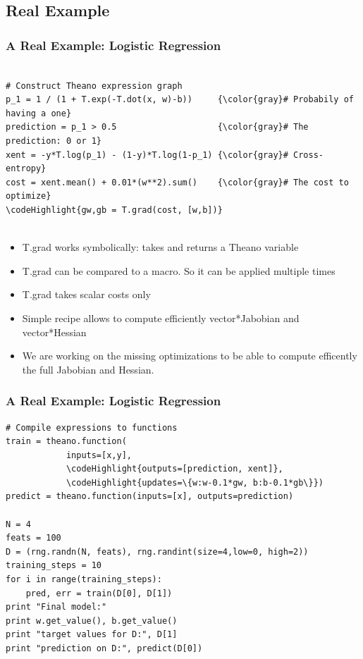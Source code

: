 \documentclass[a4paper,9pt]{beamer}
\begin{document}
\subsection{Real Example}
\begin{frame}[fragile]
  \frametitle{A Real Example: Logistic Regression}
\begin{Verbatim}[commandchars=\\\{\}]

# Construct Theano expression graph
p_1 = 1 / (1 + T.exp(-T.dot(x, w)-b))     {\color{gray}# Probabily of having a one}
prediction = p_1 > 0.5                    {\color{gray}# The prediction: 0 or 1}
xent = -y*T.log(p_1) - (1-y)*T.log(1-p_1) {\color{gray}# Cross-entropy}
cost = xent.mean() + 0.01*(w**2).sum()    {\color{gray}# The cost to optimize}
\codeHighlight{gw,gb = T.grad(cost, [w,b])}


\end{Verbatim}
\begin{itemize}
\item T.grad works symbolically: takes and returns a Theano variable
\item T.grad can be compared to a macro. So it can be applied multiple times
\item T.grad takes scalar costs only
\item Simple recipe allows to compute efficiently vector*Jabobian and vector*Hessian
\item We are working on the missing optimizations to be able to compute efficently the full Jabobian and Hessian. 
\end{itemize}
\end{frame}

\begin{frame}[fragile]
  \frametitle{A Real Example: Logistic Regression}
\begin{Verbatim}[commandchars=\\\{\}]
# Compile expressions to functions
train = theano.function(
            inputs=[x,y],
            \codeHighlight{outputs=[prediction, xent]},
            \codeHighlight{updates=\{w:w-0.1*gw, b:b-0.1*gb\}})
predict = theano.function(inputs=[x], outputs=prediction)

N = 4
feats = 100
D = (rng.randn(N, feats), rng.randint(size=4,low=0, high=2))
training_steps = 10
for i in range(training_steps):
    pred, err = train(D[0], D[1])
print "Final model:"
print w.get_value(), b.get_value()
print "target values for D:", D[1]
print "prediction on D:", predict(D[0])
\end{Verbatim}
\end{frame}
\end{document}
